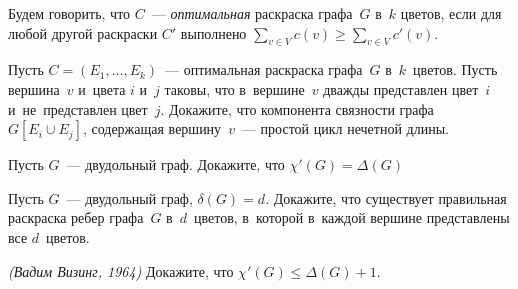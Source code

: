 Будем говорить, что $C$~--- \emph{оптимальная} раскраска графа~$G$ в~$k$
цветов, если для любой другой раскраски $C'$ выполнено
\(
    \sum_{v \in V}
        c(v)
\geq
    \sum_{v \in V}
        c'(v)
\).

\begin{problems}

\item
Пусть $C = (E_1, \ldots, E_k)$~--- оптимальная раскраска графа~$G$
в~$k$~цветов.
Пусть вершина~$v$ и~цвета $i$ и~$j$ таковы, что в~вершине~$v$ дважды
представлен цвет~$i$ и~не~представлен цвет~$j$.
Докажите, что компонента связности графа $G[E_i \cup E_j]$, содержащая
вершину~$v$~--- простой цикл нечетной длины.

\item
Пусть $G$~--- двудольный граф.
Докажите, что $\chi'(G) = \Delta(G)$

\item
Пусть $G$~--- двудольный граф, $\delta(G) = d$.
Докажите, что существует правильная раскраска ребер графа~$G$ в~$d$~цветов,
в~которой в~каждой вершине представлены все $d$~цветов.


\item\emph{(Вадим Визинг, 1964)}
Докажите, что $\chi'(G) \leq \Delta(G) + 1$.

\end{problems}

